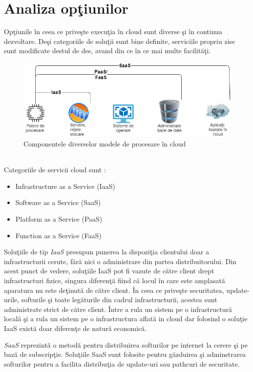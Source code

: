 \documentclass[a4paper,12pt]{report}
\begin{document}
\section{Analiza opţiunilor}
\quad Opţiunile în ceea ce priveşte execuţia în cloud sunt diverse şi în continua dezvoltare. Deşi categoriile de soluţii sunt bine definite, serviciile propriu zise sunt modificate destul de des, avand din ce în ce mai multe facilităţi.
\begin{figure}[h]
\begin{center}
        \includegraphics[width=1\textwidth]{images/cloudDiagram}
			 \caption{Componentele diverselor modele de procesare în cloud}
			 \label{fig:cloud_diagram}
\end{center}
\end{figure}
\\
Categoriile de servicii cloud sunt : 
\begin{itemize}
\item Infrastructure as a Service (IaaS)
\item Software as a Service (SaaS) 
\item Platform as a Service (PaaS) 
\item Function as a Service (FaaS) 
\end{itemize}
\par Soluţiile de tip \emph{IaaS} presupun punerea la dispoziţia clientului doar a infrastructurii cerute, fără nici o administrare din partea distribuitorului. Din acest punct de vedere, soluţiile IaaS pot fi vazute de către client drept infrastructuri fizice, singura diferenţă fiind că locul în care este amplasată aparatura nu este deţinută de către client. În ceea ce priveşte securitatea, update-urile, softurile şi toate legăturile din cadrul infrastructurii, acestea sunt administrate strict de către client. Între a rula un sistem pe o infrastructură locală şi a rula un sistem pe o infrastructura aflată in cloud dar folosind o soluţie IaaS există doar diferenţe de natură economică. 

\par \emph{SaaS} reprezintă o metodă pentru distribuirea softurilor pe internet la cerere şi pe bază de subscripţie. Soluţiile SaaS sunt folosite pentru găzduirea şi adminstrarea softurilor pentru a facilita distribuţia de update-uri sau pathcuri de securitate.
\end{document}
